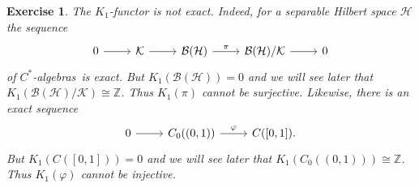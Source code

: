 \documentclass{book}
\newtheorem{exercise}{Exercise}[section]
\def\cstars{\(C^*\)-algebras}
\begin{document}
\begin{exercise}\label{ex:739}
  The \(K_1\)-functor is not exact. Indeed, for a separable Hilbert space \(\mathcal{H}\) the sequence
  \[
      \begin{tikzcd}
      0\arrow[r]&\mathcal{K}\arrow[r]&\mathcal{B}(\mathcal{H}) \arrow[r,"\pi"]&\mathcal{B}(\mathcal{H})/\mathcal{K} \arrow[r]&0
      \end{tikzcd}   
  \]
  of \cstars\ is exact. But \(K_1(\mathcal{B}(\mathcal{H}))=0\) and we will see later that \(K_1(\mathcal{B}(\mathcal{H})/\mathcal{K})\cong\mathbb{Z}\).
  Thus \(K_1(\pi)\) cannot be surjective. Likewise, there is an exact sequence
  \[
      \begin{tikzcd}
      0\arrow[r]&C_0((0,1)) \arrow[r,"\varphi"]&C([0,1]).
      \end{tikzcd}   
  \]
  But \(K_1(C([0,1]))=0\) and we will see later that \(K_1(C_0((0,1)))\cong\mathbb{Z}\).
  Thus \(K_1(\varphi)\) cannot be injective.
\end{exercise}
\end{document}
